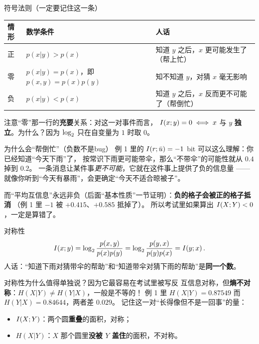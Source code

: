 \begin{defbox}{符号法则（一定要记住这一条）}
\begin{center}
\small
\begin{tabular}{@{}lll@{}}
\toprule
情形 & 数学条件 & 人话 \\
\midrule
正 & $p(x|y)>p(x)$ & 知道 $y$ 之后，$x$ 更可能发生了（帮上忙） \\
零 & $p(x|y)=p(x)$，即 $p(x,y)=p(x)p(y)$ & 知不知道 $y$，对猜 $x$ 毫无影响 \\
负 & $p(x|y)<p(x)$ & 知道 $y$ 之后，$x$ 反而更不可能了（帮倒忙） \\
\bottomrule
\end{tabular}
\end{center}
注意“零”那一行的\textbf{充要}关系：对这一对事件而言，
$I\!\left(x;y\right)=0\iff x$ 与 $y$ \textbf{独立}。为什么？因为 $\log_{2}$ 只在自变量为 $1$ 时取 $0$。
\end{defbox}

\begin{idea}{为什么会“帮倒忙”（负数不是bug）}
例 1 里的 $I\!\left(r;\bar u\right)=-1$ bit 可以这么理解：你已经知道“今天下雨”了，
按常识下雨更可能带伞，那么“不带伞”的可能性就从 $0.4$ 掉到 $0.2$。
一条消息让某件事\emph{更不可能}，它就在这件事上提供了负的信息量
——就像你听到“今天有暴雨”，会更确定“今天不适合晾被子”。

而“平均互信息”永远非负（后面“基本性质”一节证明）：\textbf{负的格子会被正的格子抵消}
（例 1 里 $-1$ 被 $+0.415$、$+0.585$ 抵掉了）。
所以考试里如果算出 $I\!\left(X;Y\right)<0$，一定是算错了。
\end{idea}

\begin{defbox}{对称性}
\[
I\!\left(x;y\right)=\log_{2}\frac{p(x,y)}{p(x)p(y)}
=\log_{2}\frac{p(y,x)}{p(y)p(x)}=I\!\left(y;x\right).
\]
人话：“知道下雨对猜带伞的帮助”和“知道带伞对猜下雨的帮助”是\textbf{同一个数}。
\end{defbox}

\begin{idea}{对称性为什么值得单独说？因为它最容易在考试里被写反}
互信息对称，但\textbf{熵不对称}：$H(X|Y)\ne H(Y|X)$，一般是不等的！
例 1 里 $H(X|Y)=0.87549$ 而 $H(Y|X)=0.84644$，两者差 $0.029$。
记住这一对“长得像但不是一回事”的量：
\begin{itemize}[leftmargin=1.4em,itemsep=1pt,topsep=1pt]
  \item $I\!\left(X;Y\right)$：两个圆\textbf{重叠}的面积，对称；
  \item $H(X|Y)$：$X$ 那个圆里\textbf{没被 $Y$ 盖住}的面积，不对称。
\end{itemize}
\end{idea}

